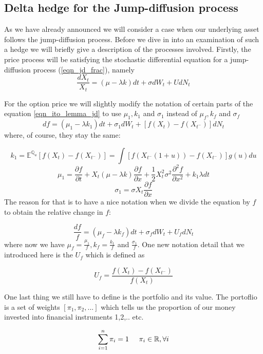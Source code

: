 \documentclass[times, utf8, diplomski]{fer}
\begin{document}
\subsection{Delta hedge for the Jump-diffusion process}
As we have already announced we will consider a case when our underlying asset follows the jump-diffusion process. Before we dive in into an examination of such a hedge we will briefly give a description of the processes involved. Firstly, the price process will be satisfying the stochastic differential equation for a jump-diffusion process (\ref{eqn_jd_frac}), namely
\begin{equation}\label{eqn_delta_hedge_x}
	\frac{dX_t}{X_t} = (\mu - \lambda k)dt + \sigma dW_t + UdN_t
\end{equation}

For the option price we will slightly modify the notation of certain parts of the equation \ref{eqn_ito_lemma_jd} to use $\mu_1, k_1$ and $\sigma_1$ instead of $\mu_f, k_f$ and $\sigma_f$
$$ df = (\mu_1 - \lambda k_1)dt + \sigma_1 dW_t + [f(X_t) - f(X_{t^-})]dN_t $$ where, of course, they stay the same:

$$ k_1 = \mathbb{E}^{\mathbb{Q}_u}[f(X_t) - f(X_{t^-})] = \int[f(X_{t^-}(1 + u)) - f(X_{t^-})]g(u)du $$
$$ \mu_1 = \frac{\partial f}{\partial t} + X_t(\mu - \lambda k)\frac{\partial f}{\partial x} + \frac{1}{2}X_t^2\sigma^2\frac{\partial^2 f}{\partial x^2} + k_1 \lambda dt $$
$$ \sigma_1 = \sigma X_t\frac{\partial f}{\partial x} $$
The reason for that is to have a nice notation when we divide the equation by $f$ to obtain the relative change in $f$:

\begin{equation} \label{eqn_delta_hedge_f}
	\frac{df}{f} = (\mu_f - \lambda k_f)dt + \sigma_f dW_t + U_fdN_t
\end{equation} where now we have $\mu_f = \frac{\mu_1}{f}, k_f = \frac{k_1}{f}$ and $\frac{\sigma_1}{f}$. One new notation detail that we introduced here is the $U_f$ which is defined as

\begin{equation}
	U_f = \frac{f(X_t) - f(X_{t^-})}{f(X_t)}
\end{equation}

One last thing we still have to define is the portfolio and its value. The portoflio is a set of weights $[\pi_1, \pi_2, ...]$ which tells us the proportion of our money invested into financial instruments 1,2,.. etc. 

$$ \sum_{i=1}^{n} \pi_i = 1 \hspace{0.5cm} \pi_i \in \mathbb{R},\forall i $$
\end{document}
